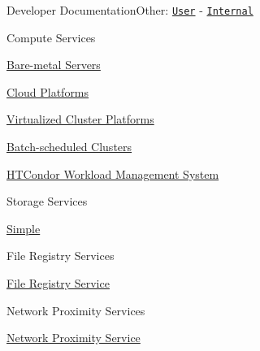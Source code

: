 Developer DocumentationOther\+: \href{../user/guide.html}{\tt User} -\/ \href{../internal/guide.html}{\tt Internal}


\begin{DoxyEnumerate}
\item Compute Services
\begin{DoxyEnumerate}
\item \hyperlink{guide-baremetal}{Bare-\/metal Servers}
\item \hyperlink{guide-cloud}{Cloud Platforms}
\item \hyperlink{guide-virtualizedcluster}{Virtualized Cluster Platforms}
\item \hyperlink{guide-batch}{Batch-\/scheduled Clusters}
\item \hyperlink{guide-htcondor}{H\+T\+Condor Workload Management System}
\end{DoxyEnumerate}
\item Storage Services
\begin{DoxyEnumerate}
\item \hyperlink{guide-simplestorage}{Simple}
\end{DoxyEnumerate}
\item File Registry Services
\begin{DoxyEnumerate}
\item \hyperlink{guide-fileregistry}{File Registry Service}
\end{DoxyEnumerate}
\item Network Proximity Services
\begin{DoxyEnumerate}
\item \hyperlink{guide-networkproximity}{Network Proximity Service} 
\end{DoxyEnumerate}
\end{DoxyEnumerate}